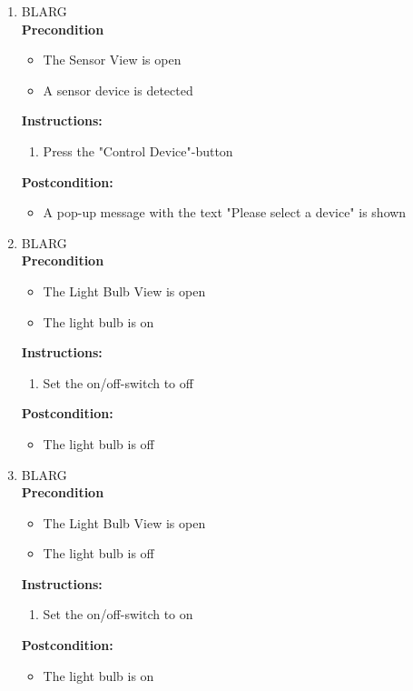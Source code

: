 \documentclass[a4paper]{article}
\newlength{\testlabellength}
\newenvironment{testlist}{\begin{enumerate}[label=\bfseries Instruction \thesubsection.\arabic* , labelindent=0pt, labelwidth=\testlabellength , leftmargin=2cm]}{\end{enumerate}}
\newenvironment{precondition}{
{\color{white}BLARG}\\ 
\textbf{Precondition}
\begin{itemize}[labelindent=0cm, labelwidth=2cm , leftmargin=1cm]
}
{\end{itemize}}
\newenvironment{instruction}{
\textbf{Instructions:}
\begin{enumerate}[label=\bfseries  \arabic*., labelindent=0cm, labelwidth=2cm , leftmargin=1cm]
}
{\end{enumerate}}
\newenvironment{postcondition}{
\textbf{Postcondition:}
\begin{itemize}[labelindent=0cm, labelwidth=2cm , leftmargin=1cm]
}
{\end{itemize}}
\begin{document}
\begin{appendices}
\begin{testlist}
	\item
		\begin{precondition}
			\item The Sensor View is open
			\item A sensor device is detected
		\end{precondition}
		\begin{instruction}
			\item Press the "Control Device"-button
		\end{instruction}
		\begin{postcondition}
			\item A pop-up message with the text "Please select a device" is shown
		\end{postcondition}

	\item
		\begin{precondition}
			\item The Light Bulb View is open
			\item The light bulb is on
		\end{precondition}
		\begin{instruction}
			\item Set the on/off-switch to off
		\end{instruction}
		\begin{postcondition}
			\item The light bulb is off
		\end{postcondition}

	\item
		\begin{precondition}
			\item The Light Bulb View is open
			\item The light bulb is off
		\end{precondition}
		\begin{instruction}
			\item Set the on/off-switch to on
		\end{instruction}
		\begin{postcondition}
			\item The light bulb is on
		\end{postcondition}


\end{testlist}
\end{appendices}
\end{document}
